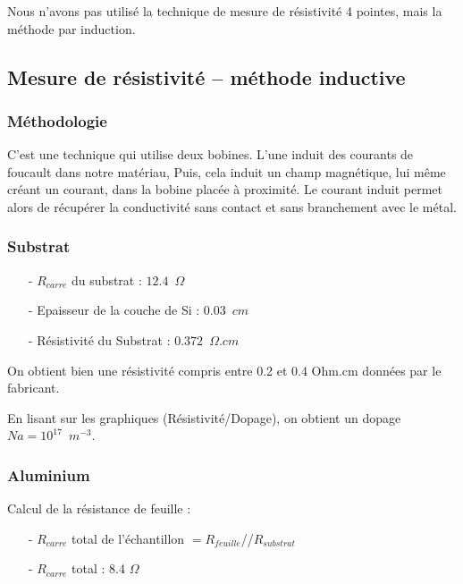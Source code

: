 \documentclass[11pt]{article}
\begin{document}
Nous n'avons pas utilis\'e la technique de mesure de r\'esistivit\'e 4 pointes, mais la m\'ethode par induction. 
    
\subsection{Mesure de r\'esistivit\'e -- m\'ethode inductive}

\subsubsection {M\'ethodologie }
C'est une technique qui utilise deux bobines. L'une induit des courants de foucault dans notre mat\'eriau, Puis, cela induit un champ magn\'etique, lui m\^eme cr\'eant un courant, dans la bobine plac\'ee \`a proximit\'e. Le courant induit permet alors de r\'ecup\'erer la conductivit\'e sans contact et sans branchement avec le m\'etal.

\subsubsection{Substrat} 

\begin{itemize}
\item[-] $R_{carre}$ du substrat : $ 12.4 \phantom{2} \Omega$
\item[-] Epaisseur de la couche de Si : $0.03 \phantom{2} cm$
\item[-] R\'esistivit\'e du Substrat : $ 0.372 \phantom{2} \Omega.cm$
\end{itemize}


On obtient bien une r\'esistivit\'e compris entre 0.2 et 0.4 Ohm.cm donn\'ees par le fabricant. 

En lisant sur les graphiques (R\'esistivit\'e/Dopage), on obtient un dopage $Na = 10^{17} \phantom{2}  m^{-3}$.

\subsubsection{ Aluminium}

Calcul de la r\'esistance de feuille :

\begin{itemize}
\item[-] $R_{carre}$ total de l'\'echantillon $= R_{feuille}$//$R_{substrat}$
\item[-] $R_{carre}$ total : 8.4 $\Omega$
\end{itemize}
\end{document}
